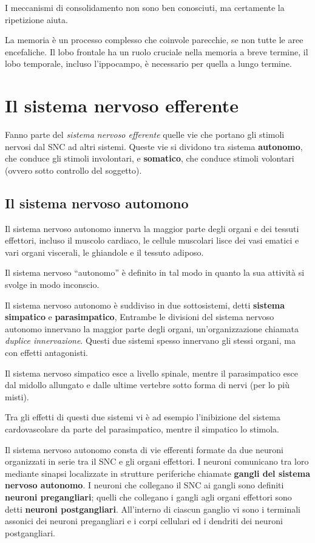 \documentclass[]{article}
\begin{document}
I meccanismi di consolidamento non sono ben conosciuti, ma certamente la
ripetizione aiuta.

La memoria è un processo complesso che coinvole parecchie, se non tutte
le aree encefaliche. Il lobo frontale ha un ruolo cruciale nella memoria
a breve termine, il lobo temporale, incluso l'ippocampo, è necessario
per quella a lungo termine.

\section{Il sistema nervoso
efferente}\label{il-sistema-nervoso-efferente}

Fanno parte del \emph{sistema nervoso efferente} quelle vie che portano
gli stimoli nervosi dal SNC ad altri sistemi. Queste vie si dividono tra
sistema \textbf{autonomo}, che conduce gli stimoli involontari, e
\textbf{somatico}, che conduce stimoli volontari (ovvero sotto controllo
del soggetto).

\subsection{Il sistema nervoso
automono}\label{il-sistema-nervoso-automono}

Il sistema nervoso autonomo innerva la maggior parte degli organi e dei
tessuti effettori, incluso il muscolo cardiaco, le cellule muscolari
lisce dei vasi ematici e vari organi viscerali, le ghiandole e il
tessuto adiposo.

Il sistema nervoso ``autonomo'' è definito in tal modo in quanto la sua
attività si svolge in modo inconscio.

Il sistema nervoso autonomo è suddiviso in due sottosistemi, detti
\textbf{sistema simpatico} e \textbf{parasimpatico}, Entrambe le
divisioni del sistema nervoso autonomo innervano la maggior parte degli
organi, un'organizzazione chiamata \emph{duplice innervazione}. Questi
due sistemi spesso innervano gli stessi organi, ma con effetti
antagonisti.

Il sistema nervoso simpatico esce a livello spinale, mentre il
parasimpatico esce dal midollo allungato e dalle ultime vertebre sotto
forma di nervi (per lo più misti).

Tra gli effetti di questi due sistemi vi è ad esempio l'inibizione del
sistema cardovascolare da parte del parasimpatico, mentre il simpatico
lo stimola.

Il sistema nervoso autonomo consta di vie efferenti formate da due
neuroni organizzati in serie tra il SNC e gli organi effettori. I
neuroni comunicano tra loro mediante sinapsi localizzate in strutture
periferiche chiamate \textbf{gangli del sistema nervoso autonomo}. I
neuroni che collegano il SNC ai gangli sono definiti \textbf{neuroni
pregangliari}; quelli che collegano i gangli agli organi effettori sono
detti \textbf{neuroni postgangliari}. All'interno di ciascun ganglio vi
sono i terminali assonici dei neuroni pregangliari e i corpi cellulari
ed i dendriti dei neuroni postgangliari.
\end{document}
